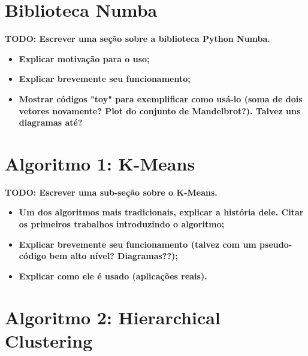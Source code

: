 \documentclass[12pt,
openright, 
oneside, %
a4paper,    %
brazil]{facom-ufu-abntex2}
\begin{document}

\section{Biblioteca Numba}
\label{sec:numba}


\textbf{TODO: Escrever uma seção sobre a biblioteca Python Numba.}

\begin{itemize}
  \item \textbf{Explicar motivação para o uso;}
  \item \textbf{Explicar brevemente seu funcionamento;}
  \item \textbf{Mostrar códigos "toy" para exemplificar como usá-lo (soma de dois vetores novamente? Plot do conjunto de Mandelbrot?). Talvez uns diagramas até?}
\end{itemize}




\section{Algoritmo 1: K-Means}
\label{sec:kmeans}


\textbf{TODO: Escrever uma sub-seção sobre o K-Means.}

\begin{itemize}
  \item \textbf{Um dos algoritmos mais tradicionais, explicar a história dele. Citar os primeiros trabalhos introduzindo o algoritmo;}
  \item \textbf{Explicar brevemente seu funcionamento (talvez com um pseudo-código bem alto nível? Diagramas??);}
  \item \textbf{Explicar como ele é usado (aplicações reais).}
\end{itemize}




\section{Algoritmo 2: Hierarchical Clustering}

\end{document}
